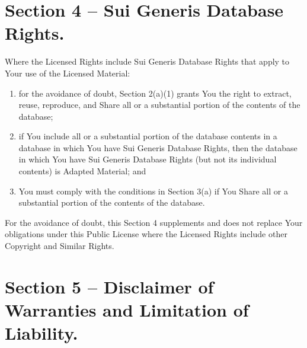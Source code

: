 \section{Section 4 – Sui Generis Database Rights.}
\label{section4}

Where the Licensed Rights include Sui Generis Database Rights that apply to Your use of the Licensed Material:

\begin{enumerate}[label=\alph*.]
  \item for the avoidance of doubt, Section 2(a)(1) grants You the right to extract, reuse, reproduce, and Share all or a substantial portion of the contents of the database;

  \item if You include all or a substantial portion of the database contents in a database in which You have Sui Generis Database Rights, then the database in which You have Sui Generis Database Rights (but not its individual contents) is Adapted Material; and

  \item You must comply with the conditions in Section 3(a) if You Share all or a substantial portion of the contents of the database.
\end{enumerate}

For the avoidance of doubt, this Section 4 supplements and does not replace Your obligations under this Public License where the Licensed Rights include other Copyright and Similar Rights.

\section{Section 5 – Disclaimer of Warranties and Limitation of Liability.}
\label{section5}

